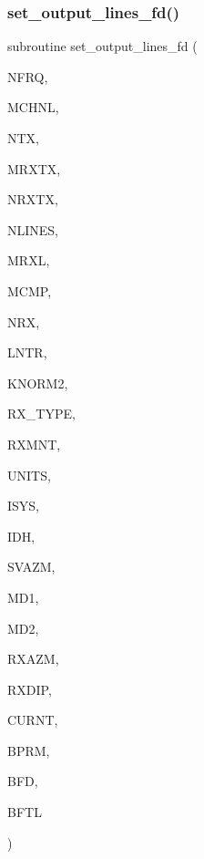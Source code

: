\mbox{\label{Leroi__c_8f90_a25dab6f0be9119c8c046915473136d9c}} 
\subsubsection{\texorpdfstring{set\+\_\+output\+\_\+lines\+\_\+fd()}{set\_output\_lines\_fd()}}
{\footnotesize\ttfamily subroutine set\+\_\+output\+\_\+lines\+\_\+fd (\begin{DoxyParamCaption}\item[{integer}]{N\+F\+RQ,  }\item[{integer}]{M\+C\+H\+NL,  }\item[{integer}]{N\+TX,  }\item[{integer}]{M\+R\+X\+TX,  }\item[{integer, dimension(ntx)}]{N\+R\+X\+TX,  }\item[{integer}]{N\+L\+I\+N\+ES,  }\item[{integer}]{M\+R\+XL,  }\item[{integer}]{M\+C\+MP,  }\item[{integer, dimension(nlines)}]{N\+RX,  }\item[{integer, dimension(4,nlines)}]{L\+N\+TR,  }\item[{integer, dimension(mrxtx,ntx)}]{K\+N\+O\+R\+M2,  }\item[{integer, dimension(nlines)}]{R\+X\+\_\+\+T\+Y\+PE,  }\item[{real, dimension(nlines)}]{R\+X\+M\+NT,  }\item[{integer, dimension(nlines)}]{U\+N\+I\+TS,  }\item[{integer}]{I\+S\+YS,  }\item[{integer, dimension(nlines)}]{I\+DH,  }\item[{real, dimension(nlines)}]{S\+V\+A\+ZM,  }\item[{integer}]{M\+D1,  }\item[{integer}]{M\+D2,  }\item[{real, dimension(md1,md2)}]{R\+X\+A\+ZM,  }\item[{real, dimension(md1,md2)}]{R\+X\+D\+IP,  }\item[{real, dimension(nfrq)}]{C\+U\+R\+NT,  }\item[{real, dimension(mrxtx,ntx)}]{B\+P\+RM,  }\item[{complex, dimension(nfrq,mrxtx,ntx,3)}]{B\+FD,  }\item[{real, dimension(mchnl,mrxl,mcmp,nlines)}]{B\+F\+TL }\end{DoxyParamCaption})}

